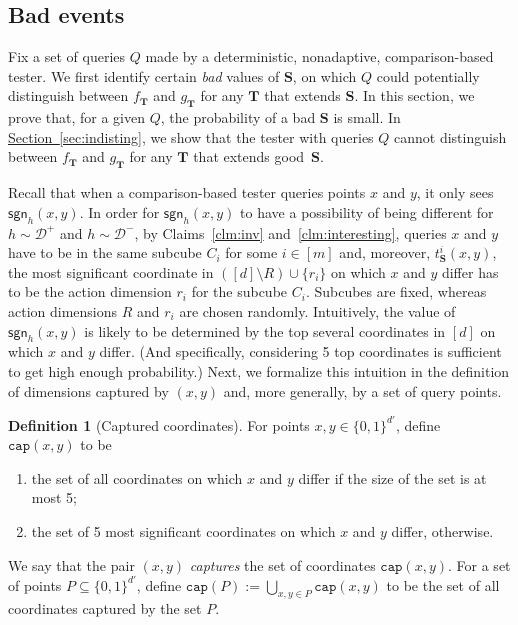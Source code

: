 \documentclass[11pt]{article}
\numberwithin{equation}{section}
\theoremstyle{definition}
\newtheorem{definition}[theorem]{Definition}
\theoremstyle{plain}
\newcommand{\expref}[2]{\hyperref[#2]{#1~\ref{#2}}}
\newcommand{\bS}{\ensuremath{\mathbf{S}}}
\newcommand{\bT}{\ensuremath{\mathbf{T}}}
\newcommand{\hypercube}{\ensuremath{\{0,1\}^\dd}}
\newcommand{\Yes}{\ensuremath{\mathcal{D}^+}}
\newcommand{\No}{\ensuremath{\mathcal{D}^-}}
\newcommand{\coord}[2]{t^{#1}_{#2}}
\newcommand{\capt}{\mathtt{cap}}
\newcommand{\dd}{\ensuremath{{d'}}}
\newcommand{\sgn}{\mathsf{sgn}}
\newcommand{\Sec}[1]{\expref{Section}{sec:#1}}
\begin{document}
\subsection{Bad events}\label{sec:bad}
Fix a set of queries $Q$ made by a deterministic, nonadaptive, comparison-based tester.
We first identify certain \emph{bad} values of $\bS$,
%
on which $Q$ could potentially distinguish between $f_{\bT}$ and $g_{\bT}$ for any $\bT$ that extends $\bS$.
In this section, we prove that, for a given $Q$, the probability
of a bad $\bS$ is small.
%
In \Sec{indisting}, we show that the tester with queries $Q$ cannot distinguish between $f_{\bT}$ and $g_{\bT}$ for any $\bT$ that extends
%
good~$\bS$.
%

Recall that when a comparison-based tester queries points $x$ and $y$, it only sees $\sgn_h(x,y)$.  In order for $\sgn_h(x,y)$ to have a possibility of being different for $h\sim\Yes$ and $h\sim\No$, by Claims~\ref{clm:inv} and~\ref{clm:interesting}, queries $x$ and $y$ have to be in the same subcube $C_i$ for some $i\in [m]$ and, moreover, $\coord{i}{\bS}(x,y)$, the most significant coordinate in $([d] \setminus R) \cup \{r_i\}$ on which $x$ and $y$ differ has to be the action dimension $r_i$ for the subcube $C_i$. Subcubes are fixed, whereas action dimensions $R$ and $r_i$ are chosen randomly. Intuitively, the value of $\sgn_h(x,y)$ is likely to be determined by the top several coordinates in $[d]$ on which $x$ and $y$ differ. (And specifically, considering 5 top coordinates is sufficient to get high enough probability.) Next, we formalize this intuition in the definition of dimensions captured by $(x,y)$ and, more generally, by a set of query points.

\begin{definition}[Captured coordinates]\label{def:cap}
For points $x,y \in \hypercube$, define $\capt(x,y)$ to be
	\begin{enumerate}
	\item the set of all coordinates on which $x$ and $y$ differ if the size of the set is at most 5;
	\item the set of 5 most significant coordinates %
	on which $x$ and $y$ differ, otherwise.
	\end{enumerate}
We say that the pair $(x,y)$ \emph{captures} the set of coordinates $\capt(x,y)$.
For a set of points
$P\subseteq \{0,1\}^{\dd}$, define $\capt(P) := \bigcup_{x,y \in P} \capt(x,y)$
to be the set of all coordinates captured by the set $P$.
\end{definition}
\end{document}
